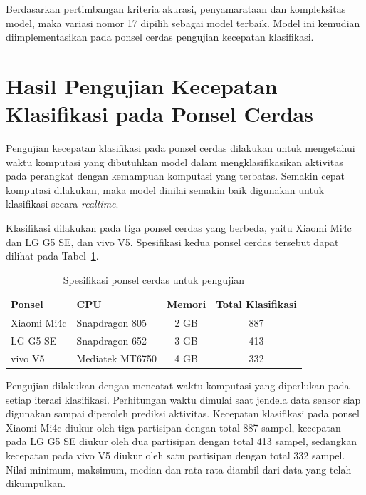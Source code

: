 Berdasarkan pertimbangan kriteria akurasi, penyamarataan dan kompleksitas model, maka variasi nomor 17 dipilih sebagai model terbaik. Model ini kemudian diimplementasikan pada ponsel cerdas pengujian kecepatan klasifikasi.

\section{Hasil Pengujian Kecepatan Klasifikasi pada Ponsel Cerdas}

Pengujian kecepatan klasifikasi pada ponsel cerdas dilakukan untuk mengetahui waktu komputasi yang dibutuhkan model dalam mengklasifikasikan aktivitas pada perangkat dengan kemampuan komputasi yang terbatas. Semakin cepat komputasi dilakukan, maka model dinilai semakin baik digunakan untuk klasifikasi secara \textit{realtime}.

Klasifikasi dilakukan pada tiga ponsel cerdas yang berbeda, yaitu Xiaomi Mi4c dan LG G5 SE, dan vivo V5. Spesifikasi kedua ponsel cerdas tersebut dapat dilihat pada Tabel~\ref{table:spesifikasi-ponsel-cerdas}.

\begin{table}[h!]
    \centering
    \caption{Spesifikasi ponsel cerdas untuk pengujian}
    \begin{tabular}{ |l|l|c|c| }
        \hline
        Ponsel & CPU & Memori & Total Klasifikasi \\

        \hline
        Xiaomi Mi4c & Snapdragon 805 & 2 GB & 887 \\

        \hline
        LG G5 SE & Snapdragon 652 & 3 GB & 413 \\

        \hline
        vivo V5 & Mediatek MT6750 & 4 GB & 332 \\

        \hline
    \end{tabular}
    \label{table:spesifikasi-ponsel-cerdas}
\end{table}

Pengujian dilakukan dengan mencatat waktu komputasi yang diperlukan pada setiap iterasi klasifikasi. Perhitungan waktu dimulai saat jendela data sensor siap digunakan sampai diperoleh prediksi aktivitas. Kecepatan klasifikasi pada ponsel Xiaomi Mi4c diukur oleh tiga partisipan dengan total 887 sampel, kecepatan pada LG G5 SE diukur oleh dua partisipan dengan total 413 sampel, sedangkan kecepatan pada vivo V5 diukur oleh satu partisipan dengan total 332 sampel. Nilai minimum, maksimum, median dan rata-rata diambil dari data yang telah dikumpulkan.

